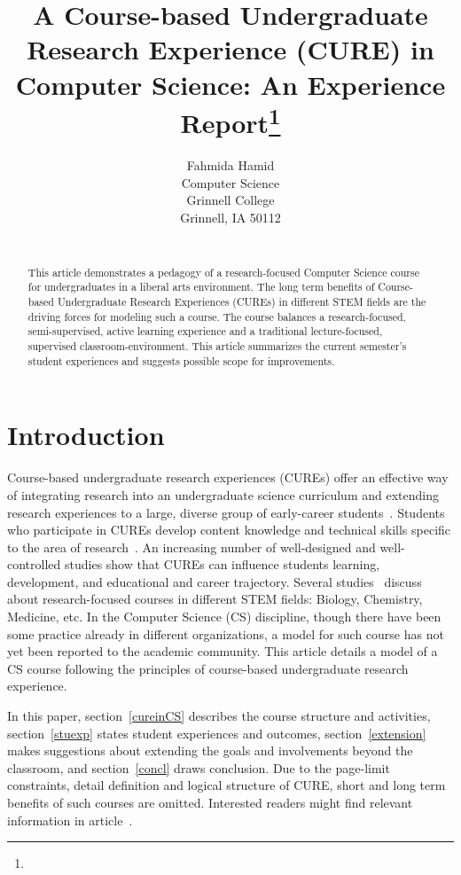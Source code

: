 \documentclass{article}
\title{A Course-based Undergraduate Research Experience (CURE) in Computer Science: An Experience Report\footnote{\protect}
}
\author{
Fahmida Hamid\\
Computer Science\\
Grinnell College\\
Grinnell, IA 50112\\
\email{fahmida.hamid@gmail.com}\\
}
\begin{document}
\maketitle

\begin{abstract}
This article demonstrates a pedagogy of a research-focused Computer Science course for undergraduates in a liberal arts environment. The long term benefits of Course-based Undergraduate Research Experiences (CUREs) in different STEM fields are the driving forces for modeling such a course. The course balances a research-focused, semi-supervised, active learning experience and a traditional lecture-focused, supervised classroom-environment. This article summarizes the current semester's student experiences and suggests possible scope for improvements.
\end{abstract}

\section{Introduction}
Course-based undergraduate research experiences (CUREs) offer an effective way of integrating research into an undergraduate science curriculum and extending research experiences to a large, diverse group of early-career students~\cite{doi:10.1187/cbe.14-01-0004,doi:10.1187/cbe.18-07-0126}. Students who participate in CUREs develop content knowledge and technical skills specific to the area of research~\cite{10.1093/femsle/fnx157}. An increasing number of well-designed and well-controlled studies show that CUREs can influence students learning, development, and educational and career trajectory\cite{eagan2013making,hurtado2009diversifying,schultz2011patching}. Several studies~\cite{doi:10.1187/cbe.14-01-0004,doi:10.1187/cbe.18-07-0126} discuss about research-focused courses in different STEM fields: Biology, Chemistry, Medicine, etc. In the Computer Science (CS) discipline, though there have been some practice already in different organizations, a model for such course has not yet been reported to the academic community. This article details a model of a CS course following the principles of course-based undergraduate research experience. 
\par In this paper, section~\ref{cureinCS} describes the course structure and activities, section~\ref{stuexp} states student experiences and outcomes, section~\ref{extension} makes suggestions about extending the goals and involvements beyond the classroom, and section~\ref{concl} draws conclusion. Due to the page-limit constraints, detail definition and logical structure of CURE, short and long term benefits of such courses are omitted. Interested readers might find relevant information in article~\cite{doi:10.1187/cbe.14-01-0004}.
   
\end{document}
